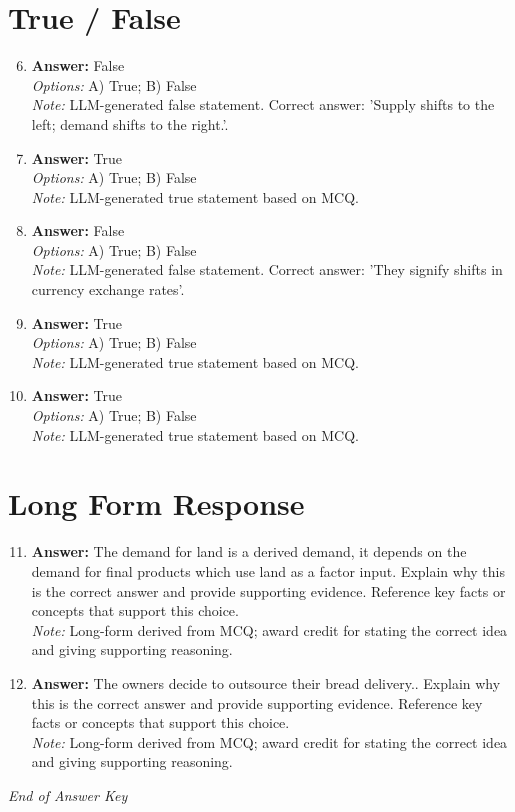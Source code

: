 \documentclass[12pt]{article}
\begin{document}
\section*{True / False}
\begin{enumerate}[label=\arabic*.]
\setcounter{enumi}{5}
\item \textbf{Answer:} False
\\ \textit{Options:} A) True; B) False
\\ \textit{Note:} LLM-generated false statement. Correct answer: 'Supply shifts to the left; demand shifts to the right.'.
\item \textbf{Answer:} True
\\ \textit{Options:} A) True; B) False
\\ \textit{Note:} LLM-generated true statement based on MCQ.
\item \textbf{Answer:} False
\\ \textit{Options:} A) True; B) False
\\ \textit{Note:} LLM-generated false statement. Correct answer: 'They signify shifts in currency exchange rates'.
\item \textbf{Answer:} True
\\ \textit{Options:} A) True; B) False
\\ \textit{Note:} LLM-generated true statement based on MCQ.
\item \textbf{Answer:} True
\\ \textit{Options:} A) True; B) False
\\ \textit{Note:} LLM-generated true statement based on MCQ.
\end{enumerate}

\section*{Long Form Response}
\begin{enumerate}[label=\arabic*.]
\setcounter{enumi}{10}
\item \textbf{Answer:} The demand for land is a derived demand, it depends on the demand for final products which use land as a factor input. Explain why this is the correct answer and provide supporting evidence. Reference key facts or concepts that support this choice.
\\ \textit{Note:} Long-form derived from MCQ; award credit for stating the correct idea and giving supporting reasoning.
\item \textbf{Answer:} The owners decide to outsource their bread delivery.. Explain why this is the correct answer and provide supporting evidence. Reference key facts or concepts that support this choice.
\\ \textit{Note:} Long-form derived from MCQ; award credit for stating the correct idea and giving supporting reasoning.
\end{enumerate}

\vfill
\noindent\textit{End of Answer Key}
\end{document}
